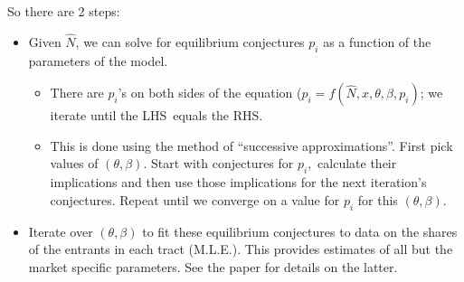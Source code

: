 \documentclass[notes=show]{beamer}
\begin{document}
\begin{frame}%


So there are 2 steps:

\begin{itemize}
\item Given $\hat{N}$, we can solve for equilibrium conjectures $p_{i}$ as a
function of the parameters of the model.

\begin{itemize}
\item There are $p_{i}$'s on both sides of the equation ($p_{i}=f(\hat{N}%
,x,\theta ,\beta ,p_{i})$; we iterate until the LHS\ equals the RHS.

\item This is done using the method of \textquotedblleft successive
approximations\textquotedblright . First pick values of $(\theta ,\beta )$.
Start with conjectures for $p_{i},$ calculate their implications and then
use those implications for the next iteration's conjectures. Repeat until we
converge on a value for $p_{i}$ for this $(\theta ,\beta ).$
\end{itemize}

\item Iterate over $(\theta ,\beta )$ to fit these equilibrium conjectures
to data on the shares of the entrants in each tract (M.L.E.). This provides
estimates of all but the market specific parameters. See the paper for
details on the latter.
\end{itemize}

\end{frame}%
\end{document}
